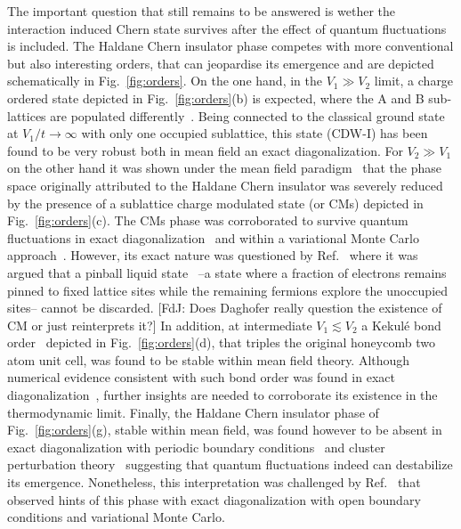 \documentclass[aps,prx,10pt,twocolumn,floatfix,superscriptaddress,showpacs,numerical,footinbib]{revtex4-1}
\newcommand{\noteFdJ}[1]{{\color{cyan} [FdJ: #1]}}
\begin{document}
The important question that still remains to be answered is wether the interaction induced Chern state survives 
after the effect of quantum fluctuations is included.
%
The Haldane Chern insulator phase competes with more conventional but also interesting orders, 
that can jeopardise its emergence and are depicted schematically in Fig.~\ref{fig:orders}.
%
On the one hand, in the $V_{1} \gg V_{2}$ limit, a charge ordered state depicted in Fig.~\ref{fig:orders}(b) is expected, 
where the A and B sub-lattices are populated differently~\cite{RQHZ08,WCT14}.
%
Being connected to the classical ground state at $V_{1}/t \to \infty$ with only one occupied sublattice, this state (CDW-I) has been found to be very robust both in mean field an exact diagonalization.
%
For $V_{2}\gg V_{1}$ on the other hand it was shown under the mean field paradigm~\cite{GCC13} that the phase space originally attributed to the Haldane Chern insulator 
was severely reduced by the presence of a sublattice charge modulated state (or CMs) depicted in Fig.~\ref{fig:orders}(c).
%
The CMs phase was corroborated to survive quantum fluctuations in exact diagonalization~\cite{GGNVC13,DCH14} and within a variational Monte Carlo approach~\cite{DCH14}.
%
However, its exact nature was questioned by Ref.~\cite{DH14} where it was argued that a pinball liquid state~\cite{HF06,MRF13} --a state where a fraction of electrons remains pinned to fixed lattice sites while the remaining fermions explore the unoccupied sites-- cannot be discarded. \noteFdJ{Does Daghofer really question the existence of CM or just reinterprets it?}
%
In addition, at intermediate $V_{1}\lesssim V_{2}$ a Kekul\'e bond order~\cite{C00,HCM07,WF10,RH10,RJH13} depicted in Fig.~\ref{fig:orders}(d), that triples the original honeycomb two atom unit cell, 
was found to be stable within mean field theory.
%
Although numerical evidence consistent with such bond order was found in exact diagonalization~\cite{GGNVC13}, further insights are needed to corroborate its existence in the thermodynamic limit.
%
Finally, the Haldane Chern insulator phase of Fig.~\ref{fig:orders}(g), stable within mean field, was found however to be absent in exact diagonalization with periodic boundary conditions~\cite{GGNVC13,DH14} and cluster perturbation theory~\cite{DH14} suggesting that quantum fluctuations indeed can destabilize its emergence.
%
Nonetheless, this interpretation was challenged by Ref.~\cite{DCH14} that observed hints of this phase with exact diagonalization with open boundary conditions and variational Monte Carlo.\\
\end{document}
